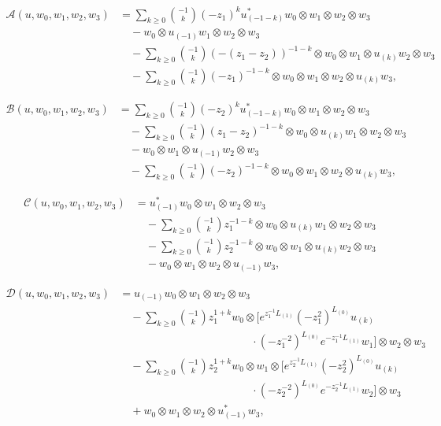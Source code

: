 \documentclass[9pt]{amsart}
\begin{document}
{\small %
\allowdisplaybreaks
\begin{align*}
\mathcal{A}(u, w_0, w_1, w_2, w_3) &= \sum_{k \geq 0} \binom{-1}{k} (-z_1)^k u_{(-1-k)}^{*} w_0 \otimes w_1 \otimes w_2 \otimes w_3 \\
&\quad - w_0 \otimes u_{(-1)} w_1 \otimes w_2 \otimes w_3 \\
&\quad - \sum_{k \geq 0} \binom{-1}{k} (-(z_1 - z_2))^{-1-k} \otimes w_0 \otimes w_1 \otimes u_{(k)} w_2 \otimes w_3 \\
&\quad - \sum_{k \geq 0} \binom{-1}{k} (-z_1)^{-1-k} \otimes w_0 \otimes w_1 \otimes w_2 \otimes u_{(k)} w_3,
\end{align*}

\begin{align*}
\mathcal{B}(u, w_0, w_1, w_2, w_3) &= \sum_{k \geq 0} \binom{-1}{k} (-z_2)^k u_{(-1-k)}^{*} w_0 \otimes w_1 \otimes w_2 \otimes w_3 \\
&\quad - \sum_{k \geq 0} \binom{-1}{k} (z_1 - z_2)^{-1-k} \otimes w_0 \otimes u_{(k)} w_1 \otimes w_2 \otimes w_3 \\
&\quad - w_0 \otimes w_1 \otimes u_{(-1)} w_2 \otimes w_3 \\
&\quad - \sum_{k \geq 0} \binom{-1}{k} (-z_2)^{-1-k} \otimes w_0 \otimes w_1 \otimes w_2 \otimes u_{(k)} w_3,
\end{align*}

\begin{align*}
\mathcal{C}(u, w_0, w_1, w_2, w_3) &= u_{(-1)}^{*} w_0 \otimes w_1 \otimes w_2 \otimes w_3 \\
&\quad - \sum_{k \geq 0} \binom{-1}{k} z_1^{-1-k} \otimes w_0 \otimes u_{(k)} w_1 \otimes w_2 \otimes w_3 \\
&\quad - \sum_{k \geq 0} \binom{-1}{k} z_2^{-1-k} \otimes w_0 \otimes w_1 \otimes u_{(k)} w_2 \otimes w_3 \\
&\quad - w_0 \otimes w_1 \otimes w_2 \otimes u_{(-1)} w_3,
\end{align*}

\begin{align*}
\mathcal{D}(u, w_0, w_1, w_2, w_3) &= u_{(-1)} w_0 \otimes w_1 \otimes w_2 \otimes w_3 \\
&\quad - \sum_{k \geq 0} \binom{-1}{k} z_1^{1+k} w_0 \otimes 
\big[ e^{z_1^{-1} L_{(1)}} (-z_1^2)^{L_{(0)}} u_{(k)} \\
&\hspace{12em} \cdot (-z_1^{-2})^{L_{(0)}} e^{-z_1^{-1} L_{(1)}} w_1 \big]
\otimes w_2 \otimes w_3 \\
&\quad - \sum_{k \geq 0} \binom{-1}{k} z_2^{1+k} w_0 \otimes w_1 \otimes 
\big[ e^{z_2^{-1} L_{(1)}} (-z_2^2)^{L_{(0)}} u_{(k)} \\
&\hspace{12em} \cdot (-z_2^{-2})^{L_{(0)}} e^{-z_2^{-1} L_{(1)}} w_2 \big]
\otimes w_3 \\
&\quad + w_0 \otimes w_1 \otimes w_2 \otimes u_{(-1)}^{*} w_3,
\end{align*}

}
\end{document}
